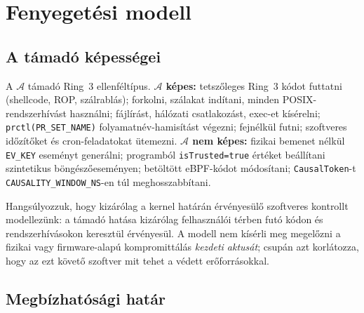 \documentclass[11pt,a4paper,twoside]{article}
\begin{document}
\section{Fenyegetési modell}

\subsection{A támadó képességei}

A $\mathcal{A}$ támadó Ring~3 ellenféltípus. \textbf{$\mathcal{A}$ képes:}
tetszőleges Ring~3 kódot futtatni (shellcode, ROP, szálrablás);
forkolni, szálakat indítani, minden POSIX-rendszerhívást használni;
fájlírást, hálózati csatlakozást, exec-et kísérelni;
\texttt{prctl(PR\_SET\_NAME)} folyamatnév-hamisítást végezni;
fejnélkül futni; szoftveres időzítőket és cron-feladatokat ütemezni.
\textbf{$\mathcal{A}$ nem képes:}
fizikai bemenet nélkül \texttt{EV\_KEY} eseményt generálni;
programból \texttt{isTrusted=true} értéket beállítani szintetikus böngészőeseményen;
betöltött eBPF-kódot módosítani;
\texttt{CausalToken}-t \texttt{CAUSALITY\_WINDOW\_NS}-en túl meghosszabbítani.

Hangsúlyozzuk, hogy kizárólag a kernel határán érvényesülő szoftveres kontrollt
modellezünk: a támadó hatása kizárólag felhasználói térben futó kódon és
rendszerhívásokon keresztül érvényesül. A modell nem kísérli meg megelőzni a
fizikai vagy firmware-alapú kompromittálás \emph{kezdeti aktusát}; csupán azt
korlátozza, hogy az ezt követő szoftver mit tehet a védett erőforrásokkal.

\subsection{Megbízhatósági határ}
\end{document}
